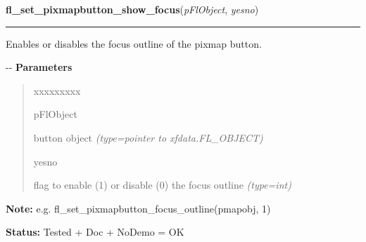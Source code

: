     \label{xformslib:flbutton:fl_set_pixmapbutton_focus_outline}

    \vspace{0.5ex}

\hspace{.8\funcindent}\begin{boxedminipage}{\funcwidth}

    \raggedright \textbf{fl\_set\_pixmapbutton\_show\_focus}(\textit{pFlObject}, \textit{yesno})

    \vspace{-1.5ex}

    \rule{\textwidth}{0.5\fboxrule}
\setlength{\parskip}{2ex}

Enables or disables the focus outline of the pixmap button.

-{}-
\setlength{\parskip}{1ex}
      \textbf{Parameters}
      \vspace{-1ex}

      \begin{quote}
        \begin{Ventry}{xxxxxxxxx}

          \item[pFlObject]


button object
            {\it (type=pointer to xfdata.FL\_OBJECT)}

          \item[yesno]


flag to enable (1) or disable (0) the focus outline
            {\it (type=int)}

        \end{Ventry}

      \end{quote}

\textbf{Note:} 
e.g. fl\_set\_pixmapbutton\_focus\_outline(pmapobj, 1)


\textbf{Status:} 
Tested + Doc + NoDemo = OK


    \end{boxedminipage}

    \label{xformslib:flbutton:fl_set_pixmapbutton_focus_data}

    \vspace{0.5ex}

